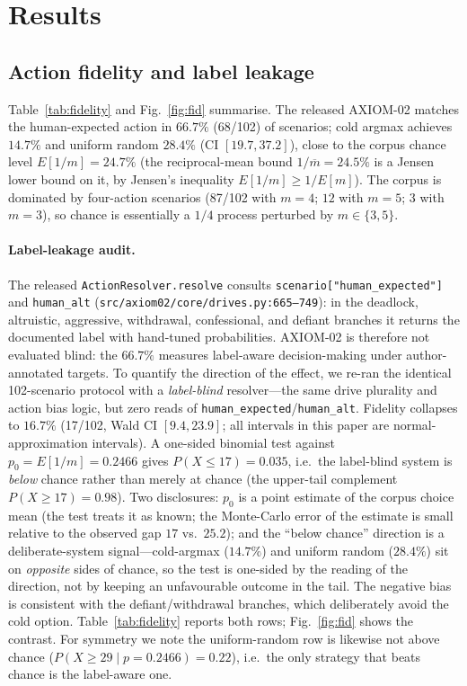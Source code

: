 \documentclass[journal]{IEEEtran}
\newcommand{\pct}{\%}
\begin{document}
\section{Results}
\label{sec:results}

\subsection{Action fidelity and label leakage}
\label{sec:leakage}
Table~\ref{tab:fidelity} and Fig.~\ref{fig:fid} summarise. The released
AXIOM-02 matches the human-expected action in $66.7\pct$ (68/102) of
scenarios; cold argmax achieves $14.7\pct$ and uniform random $28.4\pct$
(CI $[19.7,37.2]$), close to the corpus chance level
$E[1/m]=24.7\pct$ (the reciprocal-mean bound $1/\overline{m}=24.5\pct$ is
a Jensen lower bound on it, by Jensen's inequality
$E[1/m]\ge 1/E[m]$). The corpus is dominated by four-action
scenarios (87/102 with $m=4$; $12$ with $m=5$; $3$ with $m=3$), so
chance is essentially a $1/4$ process perturbed by $m\in\{3,5\}$.

\paragraph{Label-leakage audit.}
The released \texttt{ActionResolver.resolve} consults
\texttt{scenario["human\_expected"]} and \texttt{human\_alt}
(\texttt{src/axiom02/core/drives.py:665--749}): in the deadlock,
altruistic, aggressive, withdrawal, confessional, and defiant branches it
returns the documented label with hand-tuned probabilities. AXIOM-02 is
therefore not evaluated blind: the $66.7\pct$ measures label-aware
decision-making under author-annotated targets. To quantify the
direction of the effect, we re-ran the identical 102-scenario protocol
with a \emph{label-blind} resolver---the same drive plurality and action
bias logic, but zero reads of \texttt{human\_expected}/\texttt{human\_alt}.
Fidelity collapses to $16.7\pct$ (17/102, Wald CI $[9.4,23.9]$;
all intervals in this paper are normal-approximation intervals).
A one-sided binomial test against $p_0=E[1/m]=0.2466$ gives
$P(X\le17)=0.035$, i.e.\ the label-blind system is \emph{below} chance
rather than merely at chance (the upper-tail complement
$P(X\ge17)=0.98$). Two disclosures: $p_0$ is a point estimate of the
corpus choice mean (the test treats it as known; the Monte-Carlo error
of the estimate is small relative to the observed gap $17$ vs.\
$25.2$); and the ``below chance'' direction is a deliberate-system
signal---cold-argmax ($14.7\pct$) and uniform random ($28.4\pct$) sit
on \emph{opposite} sides of chance, so the test is one-sided by the
reading of the direction, not by keeping an unfavourable outcome in
the tail. The negative bias is consistent with the
defiant/withdrawal branches, which deliberately avoid the cold option.
Table~\ref{tab:fidelity} reports both rows; Fig.~\ref{fig:fid}
shows the contrast. For symmetry we note the uniform-random row is
likewise not above chance ($P(X\ge29\mid p{=}0.2466)=0.22$), i.e.\ the
only strategy that beats chance is the label-aware one.
\end{document}
